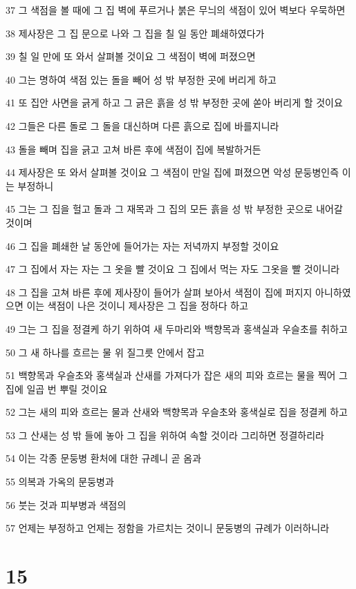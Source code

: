 \par 37 그 색점을 볼 때에 그 집 벽에 푸르거나 붉은 무늬의 색점이 있어 벽보다 우묵하면
\par 38 제사장은 그 집 문으로 나와 그 집을 칠 일 동안 폐쇄하였다가
\par 39 칠 일 만에 또 와서 살펴볼 것이요 그 색점이 벽에 퍼졌으면
\par 40 그는 명하여 색점 있는 돌을 빼어 성 밖 부정한 곳에 버리게 하고
\par 41 또 집안 사면을 긁게 하고 그 긁은 흙을 성 밖 부정한 곳에 쏟아 버리게 할 것이요
\par 42 그들은 다른 돌로 그 돌을 대신하며 다른 흙으로 집에 바를지니라
\par 43 돌을 빼며 집을 긁고 고쳐 바른 후에 색점이 집에 복발하거든
\par 44 제사장은 또 와서 살펴볼 것이요 그 색점이 만일 집에 펴졌으면 악성 문둥병인즉 이는 부정하니
\par 45 그는 그 집을 헐고 돌과 그 재목과 그 집의 모든 흙을 성 밖 부정한 곳으로 내어갈 것이며
\par 46 그 집을 폐쇄한 날 동안에 들어가는 자는 저녁까지 부정할 것이요
\par 47 그 집에서 자는 자는 그 옷을 빨 것이요 그 집에서 먹는 자도 그옷을 빨 것이니라
\par 48 그 집을 고쳐 바른 후에 제사장이 들어가 살펴 보아서 색점이 집에 퍼지지 아니하였으면 이는 색점이 나은 것이니 제사장은 그 집을 정하다 하고
\par 49 그는 그 집을 정결케 하기 위하여 새 두마리와 백향목과 홍색실과 우슬초를 취하고
\par 50 그 새 하나를 흐르는 물 위 질그릇 안에서 잡고
\par 51 백향목과 우슬초와 홍색실과 산새를 가져다가 잡은 새의 피와 흐르는 물을 찍어 그 집에 일곱 번 뿌릴 것이요
\par 52 그는 새의 피와 흐르는 물과 산새와 백향목과 우슬초와 홍색실로 집을 정결케 하고
\par 53 그 산새는 성 밖 들에 놓아 그 집을 위하여 속할 것이라 그리하면 정결하리라
\par 54 이는 각종 문둥병 환처에 대한 규례니 곧 옴과
\par 55 의복과 가옥의 문둥병과
\par 56 붓는 것과 피부병과 색점의
\par 57 언제는 부정하고 언제는 정함을 가르치는 것이니 문둥병의 규례가 이러하니라

\chapter{15}

